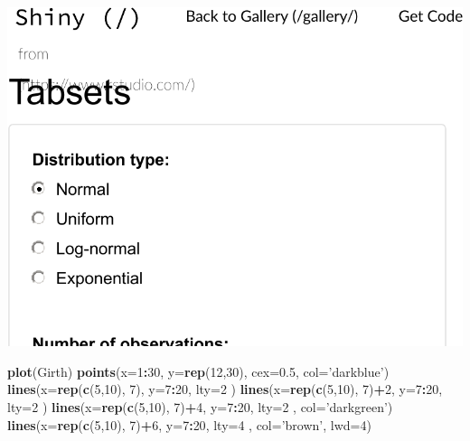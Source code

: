 \documentclass[]{book}
\newenvironment{Shaded}{\begin{snugshade}}{\end{snugshade}}
\newcommand{\DataTypeTok}[1]{\textcolor[rgb]{0.13,0.29,0.53}{#1}}
\newcommand{\DecValTok}[1]{\textcolor[rgb]{0.00,0.00,0.81}{#1}}
\newcommand{\FloatTok}[1]{\textcolor[rgb]{0.00,0.00,0.81}{#1}}
\newcommand{\KeywordTok}[1]{\textcolor[rgb]{0.13,0.29,0.53}{\textbf{#1}}}
\newcommand{\NormalTok}[1]{#1}
\newcommand{\OperatorTok}[1]{\textcolor[rgb]{0.81,0.36,0.00}{\textbf{#1}}}
\newcommand{\StringTok}[1]{\textcolor[rgb]{0.31,0.60,0.02}{#1}}
\theoremstyle{definition}
\theoremstyle{definition}
\theoremstyle{definition}
\theoremstyle{remark}
\begin{document}
\includegraphics[width=0.5\linewidth]{Rcourse_files/figure-latex/unnamed-chunk-267-1}

\begin{Shaded}
\begin{Highlighting}[]
\KeywordTok{plot}\NormalTok{(Girth)}
\KeywordTok{points}\NormalTok{(}\DataTypeTok{x=}\DecValTok{1}\OperatorTok{:}\DecValTok{30}\NormalTok{, }\DataTypeTok{y=}\KeywordTok{rep}\NormalTok{(}\DecValTok{12}\NormalTok{,}\DecValTok{30}\NormalTok{), }\DataTypeTok{cex=}\FloatTok{0.5}\NormalTok{, }\DataTypeTok{col=}\StringTok{'darkblue'}\NormalTok{)}
\KeywordTok{lines}\NormalTok{(}\DataTypeTok{x=}\KeywordTok{rep}\NormalTok{(}\KeywordTok{c}\NormalTok{(}\DecValTok{5}\NormalTok{,}\DecValTok{10}\NormalTok{), }\DecValTok{7}\NormalTok{), }\DataTypeTok{y=}\DecValTok{7}\OperatorTok{:}\DecValTok{20}\NormalTok{, }\DataTypeTok{lty=}\DecValTok{2}\NormalTok{ )}
\KeywordTok{lines}\NormalTok{(}\DataTypeTok{x=}\KeywordTok{rep}\NormalTok{(}\KeywordTok{c}\NormalTok{(}\DecValTok{5}\NormalTok{,}\DecValTok{10}\NormalTok{), }\DecValTok{7}\NormalTok{)}\OperatorTok{+}\DecValTok{2}\NormalTok{, }\DataTypeTok{y=}\DecValTok{7}\OperatorTok{:}\DecValTok{20}\NormalTok{, }\DataTypeTok{lty=}\DecValTok{2}\NormalTok{ )}
\KeywordTok{lines}\NormalTok{(}\DataTypeTok{x=}\KeywordTok{rep}\NormalTok{(}\KeywordTok{c}\NormalTok{(}\DecValTok{5}\NormalTok{,}\DecValTok{10}\NormalTok{), }\DecValTok{7}\NormalTok{)}\OperatorTok{+}\DecValTok{4}\NormalTok{, }\DataTypeTok{y=}\DecValTok{7}\OperatorTok{:}\DecValTok{20}\NormalTok{, }\DataTypeTok{lty=}\DecValTok{2}\NormalTok{ , }\DataTypeTok{col=}\StringTok{'darkgreen'}\NormalTok{)}
\KeywordTok{lines}\NormalTok{(}\DataTypeTok{x=}\KeywordTok{rep}\NormalTok{(}\KeywordTok{c}\NormalTok{(}\DecValTok{5}\NormalTok{,}\DecValTok{10}\NormalTok{), }\DecValTok{7}\NormalTok{)}\OperatorTok{+}\DecValTok{6}\NormalTok{, }\DataTypeTok{y=}\DecValTok{7}\OperatorTok{:}\DecValTok{20}\NormalTok{, }\DataTypeTok{lty=}\DecValTok{4}\NormalTok{ , }\DataTypeTok{col=}\StringTok{'brown'}\NormalTok{, }\DataTypeTok{lwd=}\DecValTok{4}\NormalTok{)}
\end{Highlighting}
\end{Shaded}
\end{document}
